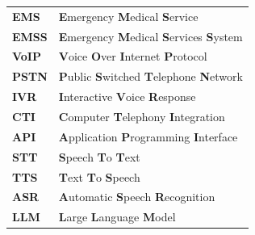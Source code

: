 
\addchaptertocentry{\abbrevname}

\begin{center}
\begin{tabular}{ll}
\textbf{EMS} & \textbf{E}mergency \textbf{M}edical \textbf{S}ervice \\
\textbf{EMSS} & \textbf{E}mergency \textbf{M}edical \textbf{S}ervices \textbf{S}ystem \\
\textbf{VoIP} & \textbf{V}oice \textbf{O}ver \textbf{I}nternet  \textbf{P}rotocol \\
\textbf{PSTN} & \textbf{P}ublic \textbf{S}witched \textbf{T}elephone  \textbf{N}etwork \\
\textbf{IVR} & \textbf{I}nteractive \textbf{V}oice \textbf{R}esponse \\
\textbf{CTI} & \textbf{C}omputer \textbf{T}elephony \textbf{I}ntegration \\
\textbf{API} & \textbf{A}pplication \textbf{P}rogramming  \textbf{I}nterface \\
\textbf{STT} & \textbf{S}peech \textbf{T}o  \textbf{T}ext  \\
\textbf{TTS} & \textbf{T}ext \textbf{T}o  \textbf{S}peech  \\
\textbf{ASR} & \textbf{A}utomatic \textbf{S}peech  \textbf{R}ecognition  \\
\textbf{LLM} & \textbf{L}arge \textbf{L}anguage  \textbf{M}odel  \\
\end{tabular}
\end{center}

\vfill

